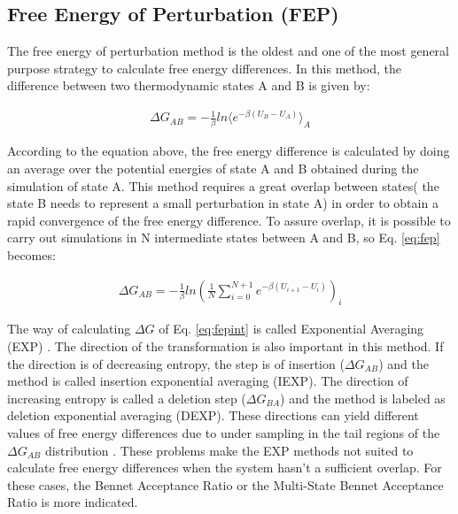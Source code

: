 \subsection{Free Energy of Perturbation (FEP)}
The free energy of perturbation method \cite{zwanzig1954} is the oldest and one of the most general purpose strategy to calculate free energy differences. In this method, the difference between two thermodynamic states A and B is given by:

\begin{equation}
\label{eq:fep}
\begin{aligned}
\Delta G_{AB} = -\frac{1}{\beta} ln \langle{e^{-\beta (U_{B}-U_{A})}}\rangle_{A}
\end{aligned}
\end{equation}

According to the equation above, the free energy difference is calculated by doing an average over the potential energies of state A and B obtained during the simulation of state A. This method requires a great overlap between states( the state B needs to represent a small perturbation in state A) in order to obtain a rapid convergence of the free energy difference. To assure overlap, it is possible to carry out simulations in N intermediate states between A and B, so Eq. \eqref{eq:fep} becomes:

\begin{equation}
\label{eq:fepint}
\begin{aligned}
\Delta G_{AB} = -\frac{1}{\beta} ln \left(\frac{1}{N}\sum_{i=0}^{N+1}
{e^{-\beta (U_{i+1}-U_{i})}}\right)_{i}
\end{aligned}
\end{equation}

The way of calculating $\Delta G$ of Eq. \eqref{eq:fepint} is called Exponential Averaging (EXP) \cite{zwanzig1955,bareva}. The direction of the transformation is also important in this method. If the direction is of decreasing entropy, the step is of insertion ($\Delta G_{AB}$) and the method is called insertion exponential averaging (IEXP). The direction of increasing entropy is  called a deletion step ($\Delta G_{BA}$) and the method is labeled as deletion exponential averaging (DEXP). These directions can yield different values of free energy differences due to under sampling in the tail regions of the $\Delta G_{AB}$ distribution \cite{klimovich,pohorille2010}. These problems make the EXP methods not suited to calculate free energy differences when the system hasn't a sufficient overlap. For these cases, the Bennet Acceptance Ratio or the Multi-State Bennet Acceptance Ratio is more indicated.   

